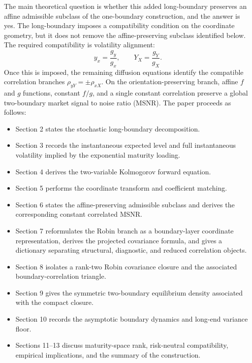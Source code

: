 \documentclass[11pt]{article}
\numberwithin{equation}{section}
\begin{document}
The main theoretical question is whether this added long-boundary preserves an affine admissible subclass of the one-boundary construction, and the answer is yes. The long-boundary imposes a compatibility condition on the coordinate geometry, but it does not remove the affine-preserving subclass identified below. The required compatibility is volatility alignment:
\begin{equation}
\label{eq:intro-vol-align}
y_x=\frac{g_y}{g_x},
\qquad
Y_X=\frac{g_Y}{g_X}.
\end{equation}
Once this is imposed, the remaining diffusion equations identify the compatible correlation branches \(\rho_{yY}=\pm\rho_{xX}\). On the orientation-preserving branch, affine \(f\) and \(g\) functions, constant \(f/g\), and a single constant correlation preserve a global two-boundary market signal to noise ratio (MSNR).
The paper proceeds as follows:

\begin {itemize}
 \item Section 2 states the stochastic long-boundary decomposition. \item Section 3 records the instantaneous expected level and full instantaneous volatility implied by the exponential maturity loading. \item Section 4 derives the two-variable Kolmogorov forward equation. \item Section 5 performs the coordinate transform and coefficient matching. \item Section 6 states the affine-preserving admissible subclass and derives the corresponding constant correlated MSNR. \item Section 7 reformulates the Robin branch as a boundary-layer coordinate representation, derives the projected covariance formula, and gives a dictionary separating structural, diagnostic, and reduced correlation objects. \item Section 8 isolates a rank-two Robin covariance closure and the associated boundary-correlation triangle. \item Section 9 gives the symmetric two-boundary equilibrium density associated with the compact closure. \item Section 10 records the asymptotic boundary dynamics and long-end variance floor. \item Sections 11--13 discuss maturity-space rank, risk-neutral compatibility, empirical implications, and the summary of the construction.
\end {itemize}
\end{document}
